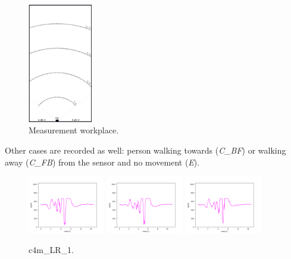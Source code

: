 \begin{figure}[!ht]
\begin{center}
\includegraphics[width=0.25\textwidth]{render/measurement.png}
\caption{Measurement workplace.\label{fig:measurement}}
\end{center}
\end{figure}

Other cases are recorded as well: person walking towards ({\it C\_BF})
or walking away ({\it C\_FB}) from the sensor and no movement ({\it E}). 

\begin{figure}[!ht]
\begin{center}
\includegraphics[width=0.3\textwidth]{../data/c4m_LR_1/c4m_LR_1_1.png}
\includegraphics[width=0.3\textwidth]{../data/c4m_LR_1/c4m_LR_1_2.png}
\includegraphics[width=0.3\textwidth]{../data/c4m_LR_1/c4m_LR_1_3.png}
\caption{c4m\_LR\_1.\label{fig:c4m_LR_1}}
\end{center}
\end{figure}

